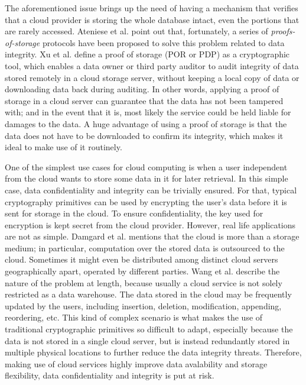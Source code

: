 The aforementioned issue brings up the need of having a mechanism that verifies that a cloud provider is storing the whole database intact, even the portions that are rarely accessed. Ateniese et al. \cite{cryptoeprint:2014:886} point out that, fortunately, a series of \textit{proofs-of-storage} protocols have been proposed to solve this problem related to data integrity. Xu et al. \cite{cryptoeprint:2014:395} define a proof of storage (POR or PDP) as a cryptographic tool, which enables a data owner or third party auditor to audit integrity of data stored remotely in a cloud storage server, without keeping a local copy of data or downloading data back during auditing. In other words, applying a proof of storage in a cloud server can guarantee that the data has not been tampered with; and in the event that it is, most likely the service could be held liable for damages to the data. A huge advantage of using a proof of storage is that the data does not have to be downloaded to confirm its integrity, which makes it ideal to make use of it routinely. 

One of the simplest use cases for cloud computing is when a user independent from the cloud wants to store some data in it for later retrieval. In this simple case, data confidentiality and integrity can be trivially ensured. For that, typical cryptography primitives can be used by encrypting the user's data before it is sent for storage in the cloud. To ensure confidentiality, the key used for encryption is kept secret from the cloud provider. However, real life applications are not as simple. Damgard et al. \cite{cryptoeprint:2013:629} mentions that the cloud is more than a storage medium; in particular, computation over the stored data is outsourced to the cloud. Sometimes it might even be distributed among distinct cloud servers geographically apart, operated by different parties. Wang et al. \cite{cryptoeprint:2009:081} describe the nature of the problem at length, because usually a cloud service is not solely restricted as a data warehouse. The data stored in the cloud may be frequently updated by the users, including insertion, deletion, modification, appending, reordering, etc. This kind of complex scenario is what makes the use of traditional cryptographic primitives so difficult to adapt, especially because the data is not stored in a single cloud server, but is instead redundantly stored in multiple physical locations to further reduce the data integrity threats. Therefore, making use of cloud services highly improve data avalability and storage flexibility, data confidentiality and integrity is put at risk.

